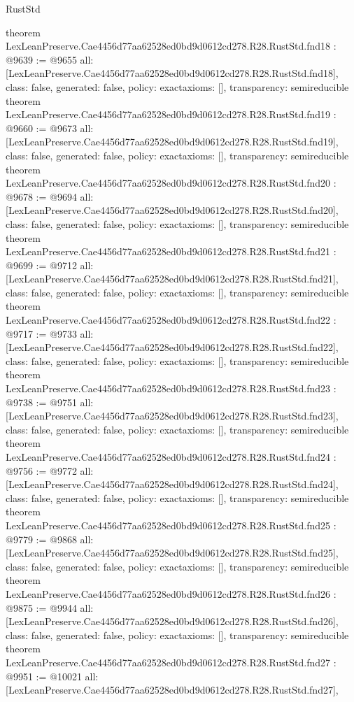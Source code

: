 \begin{lexlean}{RustStd}
\begin{coremodule}
{}
theorem LexLeanPreserve.Cae4456d77aa62528ed0bd9d0612cd278.R28.RustStd.fnd18 : @9639 := @9655 {
  all: [LexLeanPreserve.Cae4456d77aa62528ed0bd9d0612cd278.R28.RustStd.fnd18],
  class: false,
  generated: false,
  policy: exact{axioms: []},
  transparency: semireducible
}
theorem LexLeanPreserve.Cae4456d77aa62528ed0bd9d0612cd278.R28.RustStd.fnd19 : @9660 := @9673 {
  all: [LexLeanPreserve.Cae4456d77aa62528ed0bd9d0612cd278.R28.RustStd.fnd19],
  class: false,
  generated: false,
  policy: exact{axioms: []},
  transparency: semireducible
}
theorem LexLeanPreserve.Cae4456d77aa62528ed0bd9d0612cd278.R28.RustStd.fnd20 : @9678 := @9694 {
  all: [LexLeanPreserve.Cae4456d77aa62528ed0bd9d0612cd278.R28.RustStd.fnd20],
  class: false,
  generated: false,
  policy: exact{axioms: []},
  transparency: semireducible
}
theorem LexLeanPreserve.Cae4456d77aa62528ed0bd9d0612cd278.R28.RustStd.fnd21 : @9699 := @9712 {
  all: [LexLeanPreserve.Cae4456d77aa62528ed0bd9d0612cd278.R28.RustStd.fnd21],
  class: false,
  generated: false,
  policy: exact{axioms: []},
  transparency: semireducible
}
theorem LexLeanPreserve.Cae4456d77aa62528ed0bd9d0612cd278.R28.RustStd.fnd22 : @9717 := @9733 {
  all: [LexLeanPreserve.Cae4456d77aa62528ed0bd9d0612cd278.R28.RustStd.fnd22],
  class: false,
  generated: false,
  policy: exact{axioms: []},
  transparency: semireducible
}
theorem LexLeanPreserve.Cae4456d77aa62528ed0bd9d0612cd278.R28.RustStd.fnd23 : @9738 := @9751 {
  all: [LexLeanPreserve.Cae4456d77aa62528ed0bd9d0612cd278.R28.RustStd.fnd23],
  class: false,
  generated: false,
  policy: exact{axioms: []},
  transparency: semireducible
}
theorem LexLeanPreserve.Cae4456d77aa62528ed0bd9d0612cd278.R28.RustStd.fnd24 : @9756 := @9772 {
  all: [LexLeanPreserve.Cae4456d77aa62528ed0bd9d0612cd278.R28.RustStd.fnd24],
  class: false,
  generated: false,
  policy: exact{axioms: []},
  transparency: semireducible
}
theorem LexLeanPreserve.Cae4456d77aa62528ed0bd9d0612cd278.R28.RustStd.fnd25 : @9779 := @9868 {
  all: [LexLeanPreserve.Cae4456d77aa62528ed0bd9d0612cd278.R28.RustStd.fnd25],
  class: false,
  generated: false,
  policy: exact{axioms: []},
  transparency: semireducible
}
theorem LexLeanPreserve.Cae4456d77aa62528ed0bd9d0612cd278.R28.RustStd.fnd26 : @9875 := @9944 {
  all: [LexLeanPreserve.Cae4456d77aa62528ed0bd9d0612cd278.R28.RustStd.fnd26],
  class: false,
  generated: false,
  policy: exact{axioms: []},
  transparency: semireducible
}
theorem LexLeanPreserve.Cae4456d77aa62528ed0bd9d0612cd278.R28.RustStd.fnd27 : @9951 := @10021 {
  all: [LexLeanPreserve.Cae4456d77aa62528ed0bd9d0612cd278.R28.RustStd.fnd27],
}
\end{coremodule}
\end{lexlean}

